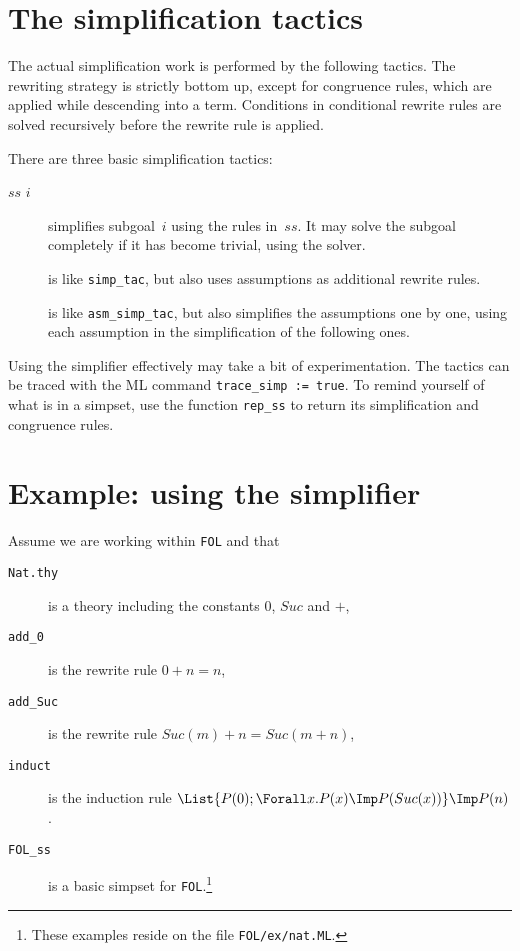 \section{The simplification tactics} \label{simp-tactics}

The actual simplification work is performed by the following tactics.  The
rewriting strategy is strictly bottom up, except for congruence rules, which
are applied while descending into a term.  Conditions in conditional rewrite
rules are solved recursively before the rewrite rule is applied.

There are three basic simplification tactics:
\begin{description}
\item[ $ss$ $i$] simplifies subgoal~$i$ using the rules
  in~$ss$.  It may solve the subgoal completely if it has become trivial,
  using the solver.
  
\item[] is like \verb$simp_tac$, but also uses
  assumptions as additional rewrite rules.

\item[] is like \verb$asm_simp_tac$, but also
  simplifies the assumptions one by one, using each assumption in the
  simplification of the following ones.
\end{description}
Using the simplifier effectively may take a bit of experimentation.  The
tactics can be traced with the ML command \verb$trace_simp := true$.  To
remind yourself of what is in a simpset, use the function \verb$rep_ss$ to
return its simplification and congruence rules.

\section{Example: using the simplifier}
Assume we are working within {\tt FOL} and that
\begin{description}
\item[\tt Nat.thy] is a theory including the constants $0$, $Suc$ and $+$,
\item[\tt add_0] is the rewrite rule $0+n = n$,
\item[\tt add_Suc] is the rewrite rule $Suc(m)+n = Suc(m+n)$,
\item[\tt induct] is the induction rule
$\List{P(0); \Forall x. P(x)\Imp P(Suc(x))} \Imp P(n)$.
\item[\tt FOL_ss] is a basic simpset for {\tt FOL}.\footnote
{These examples reside on the file {\tt FOL/ex/nat.ML}.} 
\end{description}

